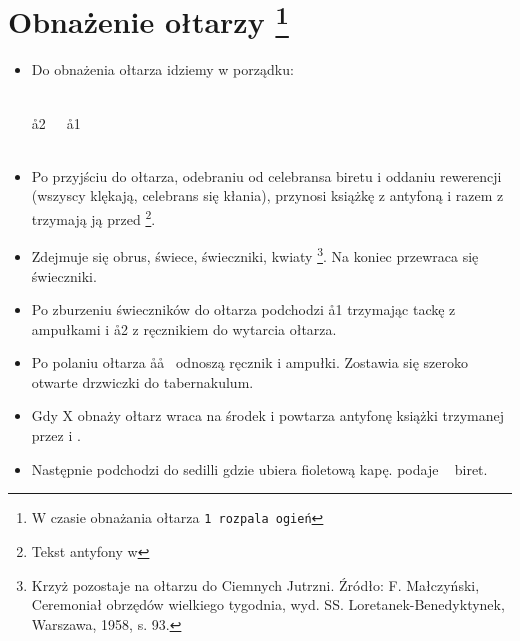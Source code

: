 \section[Obnażenie ołtarzy]{Obnażenie ołtarzy \protect\footnote{W czasie
        obnażania ołtarza \tt1 rozpala ogień}}

\begin{itemize}
      \item Do obnażenia ołtarza idziemy w porządku:
            \begin{center}
                  \uparrow \smallskip\\
                  \aa2~~~\aa1 \smallskip\\
                  ~~~ \smallskip\\
                  \ii
            \end{center}
      \item Po przyjściu do ołtarza, odebraniu od celebransa biretu i oddaniu
            rewerencji (wszyscy klękają, celebrans się kłania),  przynosi
            książkę z antyfoną i razem z  trzymają ją przed \ii
            \footnote{Tekst antyfony w }.
      \item Zdejmuje się obrus, świece, świeczniki, kwiaty \footnote{Krzyż
                  pozostaje na ołtarzu do Ciemnych Jutrzni. Źródło: F. Małczyński,
                  Ceremoniał obrzędów wielkiego tygodnia, wyd. SS.
                  Loretanek-Benedyktynek, Warszawa, 1958, s. 93.}. Na koniec przewraca
            się świeczniki.
      \item Po zburzeniu świeczników do ołtarza podchodzi \aa1 trzymając tackę z
            ampułkami i \aa2 z ręcznikiem do wytarcia ołtarza.
      \item Po polaniu ołtarza \aa\aa~ odnoszą ręcznik i ampułki. Zostawia się
            szeroko otwarte drzwiczki do tabernakulum.
      \item Gdy X obnaży ołtarz wraca na środek i powtarza antyfonę książki
            trzymanej przez  i .
      \item Następnie podchodzi do sedilli gdzie ubiera fioletową kapę. 
            podaje \ii~ biret.
\end{itemize}



